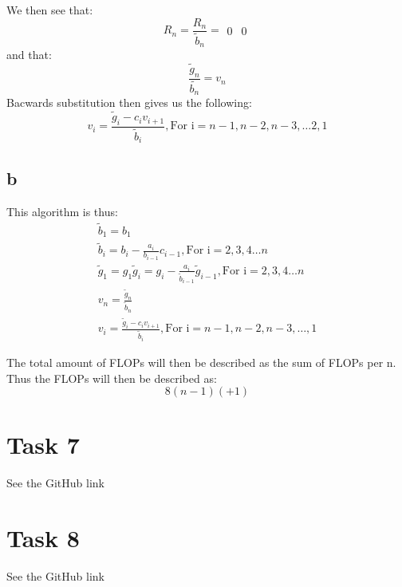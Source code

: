 \documentclass[english,notitlepage]{revtex4-1}  %
\begin{document}
        We then see that:
        \begin{equation*}
            R_n = \frac{R_n}{\tilde{b}_n} = 
            \begin{matrix}
            0 & 0 %
            \end{matrix}
        \end{equation*}
        and that:
        \begin{equation*}
            \frac{\tilde{g}_n}{\tilde{b_n}} = v_n
        \end{equation*}
            Bacwards substitution then gives us the following: 
        \begin{equation*}
            v_i = \frac{\tilde{g}_i - c_i v_{i+1}}{\tilde{b}_i}, \text{For i}  = n-1, n-2, n-3,  \dots 2, 1
        \end{equation*}
    \subsection*{b}
        \label{sec:6b}
        This algorithm is thus: 
        \begin{align*}
            \tilde{b}_1 
        =   b_1\\
            \tilde{b}_i 
        =   b_i - \frac{a_i}{b_{i-1}}c_{i-1}, \text{For i} = 2,3,4\dots n\\
            \tilde{g}_1 
        =   g_1
            \tilde{g}_i 
        =   g_i - \frac{a_i}{\tilde{b}_{i-1}}\tilde{g}_{i-1}, \text{For i} = 2, 3, 4 \dots n\\
            v_n 
        =   \frac{\tilde{g}_n}{\tilde{b}_n}\\
            v_i 
        =   \frac{\tilde{g}_i-c_i v_{i+1}}{\tilde{b}_i}, \text{For i} = n-1, n-2, n-3,\dots, 1 
        \end{align*}
        
        The total amount of FLOPs will then be described as the sum of FLOPs per n. Thus the FLOPs will then be described as: $$8(n-1)(+1)$$

        
\section*{Task 7}
    See the GitHub link
        
    
\section*{Task 8}
    See the GitHub link
\end{document}
